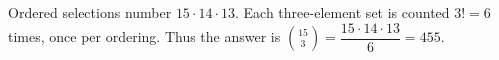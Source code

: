 Ordered selections number $ 15\cdot14\cdot13 $. Each three-element set is counted $ 3!=6 $ times, once per ordering. Thus the answer is $\binom{15}{3}=\dfrac{15\cdot14\cdot13}{6}=\boxed{455}$.
